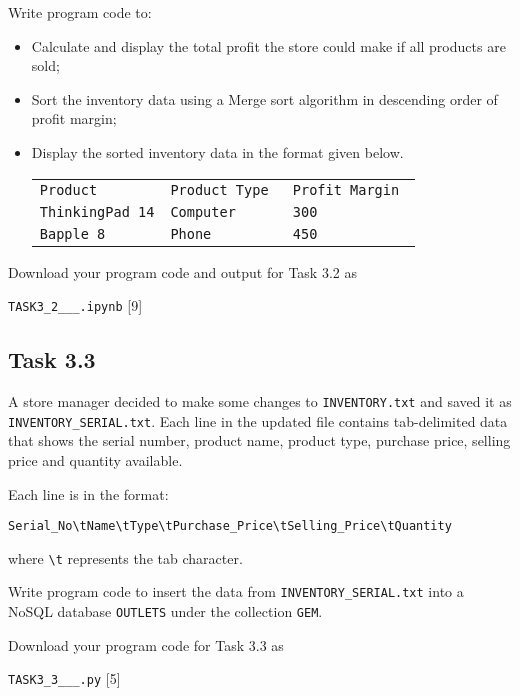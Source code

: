 Write program code to:
\begin{itemize}
\item Calculate and display the total profit the store could make if all
products are sold; 
\item Sort the inventory data using a Merge sort algorithm in descending
order of profit margin; 
\item Display the sorted inventory data in the format given below.
\noindent \begin{center}
\texttt{}%
\begin{tabular}{lll}
\texttt{Product } & \texttt{Product Type } & \texttt{Profit Margin }\tabularnewline
\texttt{ThinkingPad 14} & \texttt{Computer } & \texttt{300 }\tabularnewline
\texttt{Bapple 8 } & \texttt{Phone } & \texttt{450}\tabularnewline
\end{tabular}
\par\end{center}

\end{itemize}
Download your program code and output for Task 3.2 as 

\texttt{TASK3\_2\_<your name>\_<centre number>\_<index number>.ipynb}\hfill{}
{[}9{]}

\subsection*{Task 3.3}

A store manager decided to make some changes to \texttt{INVENTORY.txt}
and saved it as \texttt{INVENTORY\_SERIAL.txt}. Each line in the updated
file contains tab-delimited data that shows the serial number, product
name, product type, purchase price, selling price and quantity available.

Each line is in the format:

\texttt{Serial\_No\textbackslash tName\textbackslash tType\textbackslash tPurchase\_Price\textbackslash tSelling\_Price\textbackslash tQuantity}

where \texttt{\textbackslash t} represents the tab character.

Write program code to insert the data from \texttt{INVENTORY\_SERIAL.txt}
into a NoSQL database \texttt{OUTLETS} under the collection \texttt{GEM}.

Download your program code for Task 3.3 as 

\texttt{TASK3\_3\_<your name>\_<centre number>\_<index number>.py}
\hfill{}{[}5{]}


